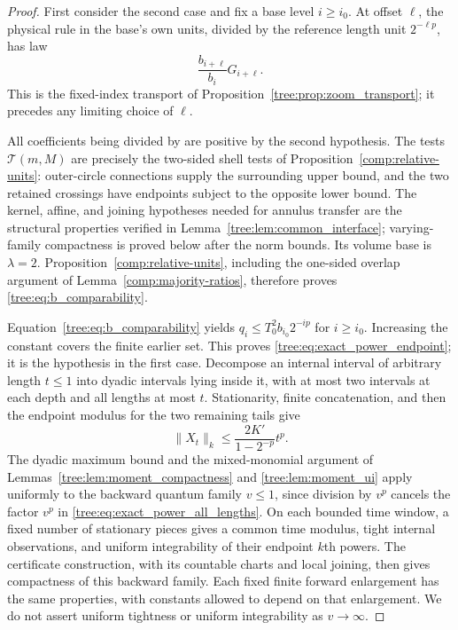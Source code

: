 \begin{proof}
First consider the second case and fix a base level $i\ge i_0$.
At offset $\ell$, the physical rule in the base's own units, divided
by the reference length unit $2^{-\ell p}$, has law
\begin{equation}\label{tree:eq:relative_b_units}
 \frac{b_{i+\ell}}{b_i}G_{i+\ell}.
\end{equation}
This is the fixed-index transport of
Proposition~\ref{tree:prop:zoom_transport}; it precedes any limiting choice
of $\ell$.

All coefficients being divided by are positive by the second
hypothesis. The tests $\mathcal T(m,M)$ are precisely the two-sided
shell tests of Proposition~\ref{comp:relative-units}: outer-circle
connections supply the surrounding upper bound, and the two retained
crossings have endpoints subject to the opposite lower bound. The
kernel, affine, and joining hypotheses needed for annulus transfer
are the structural properties verified in
Lemma~\ref{tree:lem:common_interface}; varying-family compactness is
proved below after the norm bounds. Its volume
base is $\lambda=2$. Proposition~\ref{comp:relative-units}, including
the one-sided overlap argument of Lemma~\ref{comp:majority-ratios},
therefore proves \eqref{tree:eq:b_comparability}.

Equation~\eqref{tree:eq:b_comparability} yields
$q_i\le T_0^2 b_{i_0}2^{-ip}$ for $i\ge i_0$.
Increasing the constant covers the finite earlier set.  This proves
\eqref{tree:eq:exact_power_endpoint}; it is the hypothesis in the first
case.  Decompose an internal interval of arbitrary length $t\le1$
into dyadic intervals lying inside it, with at most two intervals at
each depth and all lengths at most $t$.  Stationarity, finite
concatenation, and then the endpoint modulus for the two remaining
tails give
\begin{equation}\label{tree:eq:exact_power_all_lengths}
 \|X_t\|_k\le \frac{2K'}{1-2^{-p}}t^p.
\end{equation}
The dyadic maximum bound and the mixed-monomial argument of
Lemmas~\ref{tree:lem:moment_compactness} and \ref{tree:lem:moment_ui} apply
uniformly to the backward quantum family $v\le1$, since division by
$v^p$ cancels the factor $v^p$ in
\eqref{tree:eq:exact_power_all_lengths}. On each bounded time window,
a fixed number of stationary pieces gives a common time modulus,
tight internal observations, and uniform integrability of their
endpoint $k$th powers. The certificate construction, with its countable
charts and local joining, then gives compactness of this backward
family. Each fixed finite forward enlargement has the same properties,
with constants allowed to depend on that enlargement. We do not assert
uniform tightness or uniform integrability as $v\to\infty$.


\end{proof}
